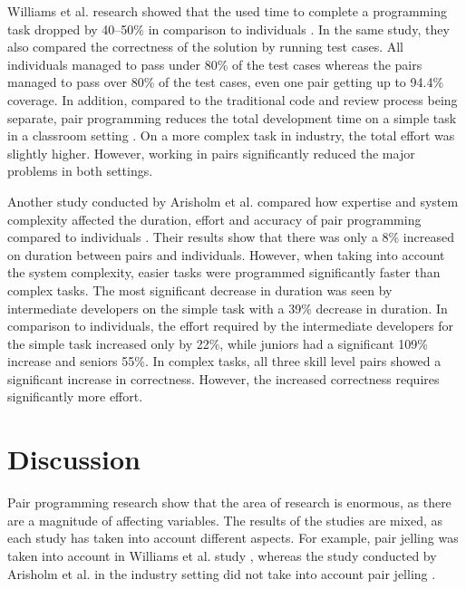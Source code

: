 \documentclass[conference]{IEEEtran}
\begin{document}
Williams et al. research showed that the used time to complete a programming task dropped by 40--50\% in comparison to individuals \cite{Williams2000Strengthening}. In the same study, they also compared the correctness of the solution by running test cases. All individuals managed to pass under 80\% of the test cases whereas the pairs managed to pass over 80\% of the test cases, even one pair getting up to 94.4\% coverage. In addition, compared to the traditional code and review process being separate, pair programming reduces the total development time on a simple task in a classroom setting \cite{10.1145/1159733.1159749}. On a more complex task in industry, the total effort was slightly higher. However, working in pairs significantly reduced the major problems in both settings. 

Another study conducted by Arisholm et al. compared how expertise and system complexity affected the duration, effort and accuracy of pair programming compared to individuals \cite{Arisholm2007Evaluating}. Their results show that there was only a 8\% increased on duration between pairs and individuals. However, when taking into account the system complexity, easier tasks were programmed significantly faster than complex tasks. The most significant decrease in duration was seen by intermediate developers on the simple task with a 39\% decrease in duration. In comparison to individuals, the effort required by the intermediate developers for the simple task increased only by 22\%, while juniors had a significant 109\% increase and seniors 55\%. In complex tasks, all three skill level pairs showed a significant increase in correctness. However, the increased correctness requires significantly more effort.



\section{Discussion}

Pair programming research show that the area of research is enormous, as there are a magnitude of affecting variables. The results of the studies are mixed, as each study has taken into account different aspects. For example, pair jelling was taken into account in Williams et al. study \cite{Williams2000Strengthening}, whereas the study conducted by Arisholm et al. in the industry setting did not take into account pair jelling \cite{Arisholm2007Evaluating}.
\end{document}
